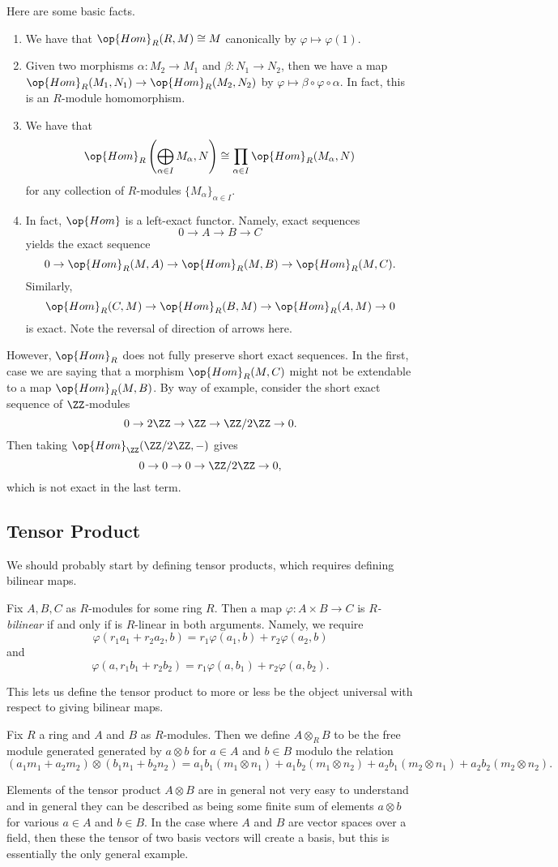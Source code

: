 Here are some basic facts.
\begin{enumerate}
	\item We have that $\op{Hom}_R(R,M)\cong M$ canonically by $\varphi\mapsto\varphi(1)$.
	\item Given two morphisms $\alpha:M_2\to M_1$ and $\beta:N_1\to N_2$, then we have a map $\op{Hom}_R(M_1,N_1)\to\op{Hom}_R(M_2,N_2)$ by $\varphi\mapsto\beta\circ\varphi\circ\alpha$. In fact, this is an $R$-module homomorphism.
	\item We have that
	\[\op{Hom}_R\left(\bigoplus_{\alpha\in I}M_\alpha,N\right)\cong\prod_{\alpha\in I}\op{Hom}_R(M_\alpha,N)\]
	for any collection of $R$-modules $\{M_\alpha\}_{\alpha\in I}$.
	\item In fact, $\op{Hom}$ is a left-exact functor. Namely, exact sequences
	\[0\to A\to B\to C\]
	yields the exact sequence
	\[0\to\op{Hom}_R(M,A)\to\op{Hom}_R(M,B)\to\op{Hom}_R(M,C).\]
	Similarly,
	\[\op{Hom}_R(C,M)\to\op{Hom}_R(B,M)\to\op{Hom}_R(A,M)\to0\]
	is exact. Note the reversal of direction of arrows here.
\end{enumerate}
\begin{remark}
	However, $\op{Hom}_R$ does not fully preserve short exact sequences. In the first, case we are saying that a morphism $\op{Hom}_R(M,C)$ might not be extendable to a map $\op{Hom}_R(M,B)$. By way of example, consider the short exact sequence of $\ZZ$-modules
	\[0\to2\ZZ\to\ZZ\to\ZZ/2\ZZ\to0.\]
	Then taking $\op{Hom}_\ZZ(\ZZ/2\ZZ,-)$ gives
	\[0\to0\to0\to\ZZ/2\ZZ\to0,\]
	which is not exact in the last term.
\end{remark}

\subsection{Tensor Product}
We should probably start by defining tensor products, which requires defining bilinear maps.
\begin{definition}[Bilinear]
	Fix $A,B,C$ as $R$-modules for some ring $R$. Then a map $\varphi:A\times B\to C$ is \textit{$R$-bilinear} if and only if is $R$-linear in both arguments. Namely, we require
	\[\varphi(r_1a_1+r_2a_2,b)=r_1\varphi(a_1,b)+r_2\varphi(a_2,b)\]
	and
	\[\varphi(a,r_1b_1+r_2b_2)=r_1\varphi(a,b_1)+r_2\varphi(a,b_2).\]
\end{definition}
This lets us define the tensor product to more or less be the object universal with respect to giving bilinear maps.
\begin{definition}
	Fix $R$ a ring and $A$ and $B$ as $R$-modules. Then we define $A\otimes_RB$ to be the free module generated generated by $a\otimes b$ for $a\in A$ and $b\in B$ modulo the relation
	\[(a_1m_1+a_2m_2)\otimes(b_1n_1+b_2n_2)=a_1b_1(m_1\otimes n_1)+a_1b_2(m_1\otimes n_2)+a_2b_1(m_2\otimes n_1)+a_2b_2(m_2\otimes n_2).\]
\end{definition}
Elements of the tensor product $A\otimes B$ are in general not very easy to understand and in general they can be described as being some finite sum of elements $a\otimes b$ for various $a\in A$ and $b\in B$. In the case where $A$ and $B$ are vector spaces over a field, then these the tensor of two basis vectors will create a basis, but this is essentially the only general example.

